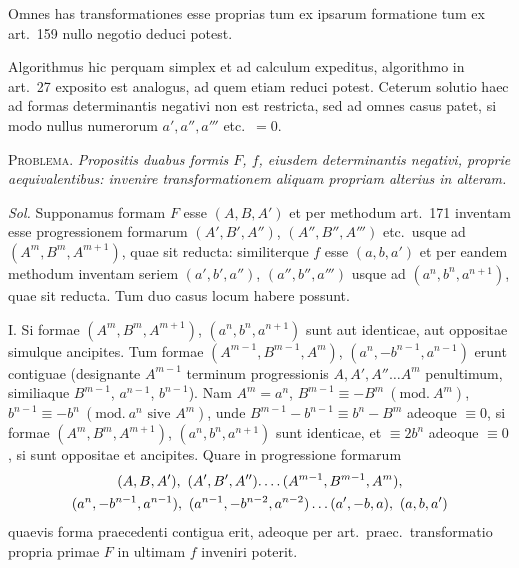 Omnes has transformationes esse proprias tum ex ipsarum formatione tum ex art.\ 159 nullo negotio deduci potest.

Algorithmus hic perquam simplex et ad calculum expeditus, algorithmo in art.\ 27 exposito est analogus, ad quem etiam reduci potest. Ceterum solutio
haec ad formas determinantis negativi non est restricta, sed ad omnes casus patet, si modo nullus numerorum $a',a'',a'''$ etc.\ $=0$.

\textsc{Problema.} \emph{Propositis duabus formis $F$, $f$, eiusdem determinantis negativi, proprie aequivalentibus: invenire transformationem aliquam propriam alterius in alteram.}

\emph{Sol.} Supponamus formam $F$ esse $(A,B,A')$ et per methodum art.\ 171 inventam esse progressionem formarum $(A',B',A'')$, $(A'',B'',A''')$ etc.\ usque ad $(A^m,B^m,A^{m+1})$, quae sit reducta: similiterque $f$ esse $(a,b,a')$ et per eandem methodum inventam seriem $(a',b',a'')$, $(a'',b'',a''')$ usque ad $(a^n,b^n,a^{n+1})$, quae sit reducta. Tum duo casus locum habere possunt.

I. Si formae $(A^m,B^m,A^{m+1})$, $(a^n,b^n,a^{n+1})$ sunt aut identicae, aut oppositae simulque ancipites. Tum formae $(A^{m-1},B^{m-1},A^m)$, $(a^n,-b^{n-1},a^{n-1})$ erunt contiguae (designante $A^{m-1}$ terminum progressionis $A,A',A''\ldots A^m$ penultimum, similiaque $B^{m-1}$, $a^{n-1}$, $b^{n-1}$). Nam $A^m=a^n$, $B^{m-1}\equiv-B^m\ (\mathrm{mod.}\ A^m)$, $b^{n-1}\equiv-b^n\ (\mathrm{mod.}\ a^n\text{ sive }A^m)$, unde $B^{m-1}-b^{n-1}\equiv b^n-B^m$ adeoque $\equiv0$, si formae $(A^m,B^m,A^{m+1})$, $(a^n,b^n,a^{n+1})$ sunt identicae, et $\equiv2b^n$ adeoque $\equiv0$, si sunt oppositae et ancipites. Quare in progressione formarum
\[
\begin{gathered}
(A,B,A'),\ (A',B',A'')\ldotp\ldotp\ldotp\ldotp(A^{m-1},B^{m-1},A^m),\\
(a^n,-b^{n-1},a^{n-1}),\ (a^{n-1},-b^{n-2},a^{n-2})\ldots(a',-b,a),\ (a,b,a')
\end{gathered}
\]
quaevis forma praecedenti contigua erit, adeoque per art.\ praec.\ transformatio propria primae $F$ in ultimam $f$ inveniri poterit.

